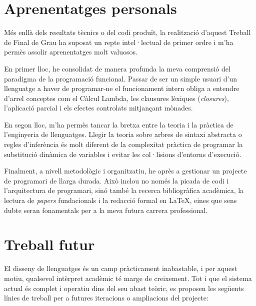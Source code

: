 \section{Aprenentatges personals}
Més enllà dels resultats tècnics o del codi produït, la realització d'aquest Treball de Final de Grau ha suposat un repte intel·lectual de primer ordre i m'ha permès assolir aprenentatges molt valuosos.

En primer lloc, he consolidat de manera profunda la meva comprensió del paradigma de la programació funcional. Passar de ser un simple usuari d'un llenguatge a haver de programar-ne el funcionament intern obliga a entendre d'arrel conceptes com el Càlcul Lambda, les clausures lèxiques (\textit{closures}), l'aplicació parcial i els efectes controlats mitjançant mònades. 

En segon lloc, m'ha permès tancar la bretxa entre la teoria i la pràctica de l'enginyeria de llenguatges. Llegir la teoria sobre arbres de sintaxi abstracta o regles d'inferència és molt diferent de la complexitat pràctica de programar la substitució dinàmica de variables i evitar les col·lisions d'entorns d'execució. 

Finalment, a nivell metodològic i organitzatiu, he après a gestionar un projecte de programari de llarga durada. Això inclou no només la picada de codi i l'arquitectura de programari, sinó també la recerca bibliogràfica acadèmica, la lectura de \textit{papers} fundacionals i la redacció formal en \LaTeX, eines que sens dubte seran fonamentals per a la meva futura carrera professional.

\section{Treball futur}
El disseny de llenguatges és un camp pràcticament inabastable, i per aquest motiu, qualsevol intèrpret acadèmic té marge de creixement. Tot i que el sistema actual és complet i operatiu dins del seu abast teòric, es proposen les següents línies de treball per a futures iteracions o ampliacions del projecte:

